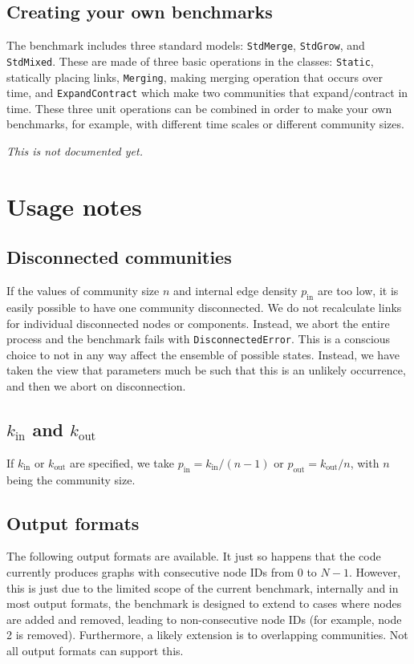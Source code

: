 \documentclass{article}
\def\pin{p_\mathrm{in}}
\def\pout{p_\mathrm{out}}
\def\kin{k_\mathrm{in}}
\def\kout{k_\mathrm{out}}
\begin{document}
\subsection{Creating your own benchmarks}
\label{sec:use-newtests}

The benchmark includes three standard models: \texttt{StdMerge},
\texttt{StdGrow}, and \texttt{StdMixed}.  These are made of three
basic operations in the classes: \texttt{Static}, statically placing links,
\texttt{Merging}, making merging operation that occurs over time, and
\texttt{ExpandContract} which make two communities that expand/contract
in time.  These three unit operations can be combined in order to make
your own benchmarks, for example, with different time scales or
different community sizes.

\textsl{This is not documented yet.}




\section{Usage notes}
\label{sec:usage-notes}

\subsection{Disconnected communities}
If the values of community size $n$ and internal edge density $\pin$
are too low, it is easily possible to have one community
disconnected.  We do not recalculate links for individual disconnected
nodes or components.  Instead, we abort the entire process and the
benchmark fails with \texttt{DisconnectedError}.  This is a conscious
choice to not in any way affect the ensemble of possible states.
Instead, we have taken the view that parameters much be such that this
is an unlikely occurrence, and then we abort on disconnection.

\subsection{$\kin$ and $\kout$}
If $\kin$ or $\kout$ are specified, we take $\pin=\kin/(n-1)$ or
$\pout=\kout/n$, with $n$ being the community size.

\subsection{Output formats}
\label{sec:output-formats}

The following output formats are available.  It just so happens that
the code currently produces graphs with consecutive node IDs from $0$
to $N-1$.  However, this is just due to the limited scope of the
current benchmark, internally and in most output formats, the
benchmark is designed to extend to cases where nodes are added and
removed, leading to non-consecutive node IDs (for example, node 2 is
removed).  Furthermore, a likely extension is to overlapping
communities.  Not all output formats can support this.
\end{document}
